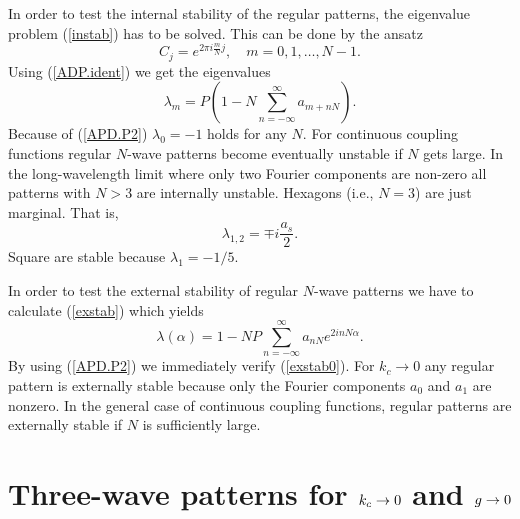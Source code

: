 In order to test the internal stability of the regular patterns,
the eigenvalue problem (\ref{instab}) has to be solved. This can be
done by the ansatz
\begin{equation}
  C_j=e^{2\pi i\frac{m}{N}j},\quad m=0,1,\ldots,N-1.
  \label{APD.cj}
\end{equation}
Using (\ref{ADP.ident}) we get the eigenvalues
\begin{equation}
  \lambda_m=P\left(1-N\sum_{n=-\infty}^\infty a_{m+nN}\right).
  \label{APD.lm}
\end{equation}
Because of (\ref{APD.P2}) $\lambda_0=-1$ holds for any $N$. For
continuous coupling functions regular $N$-wave patterns become
eventually unstable if $N$ gets large. In the long-wavelength limit
where only two Fourier components are non-zero all patterns with
$N>3$ are internally unstable. Hexagons (i.e., $N=3$) are just
marginal. That is,
\begin{equation}
  \lambda_{1,2}=\mp i\frac{a_s}{2}.
  \label{APD.lm.hex}
\end{equation}
Square are stable because $\lambda_1=-1/5$.

In order to test the external stability of regular $N$-wave patterns
we have to calculate (\ref{exstab}) which yields
\begin{equation}
  \lambda(\alpha)=1-NP\sum_{n=-\infty}^\infty a_{nN}e^{2inN\alpha}.
  \label{APD.exstab}
\end{equation}
By using (\ref{APD.P2}) we immediately verify (\ref{exstab0}). For
$k_c\to 0$ any regular pattern is externally stable because only the
Fourier components $a_0$ and $a_1$ are nonzero. In the general case
of continuous coupling functions, regular patterns are externally
stable if $N$ is sufficiently large.


\section{\protect\label{APE}Three-wave patterns for
$\lowercase{k}_{\lowercase{c}}\to 0$ and $\lowercase{g}\to 0$}

